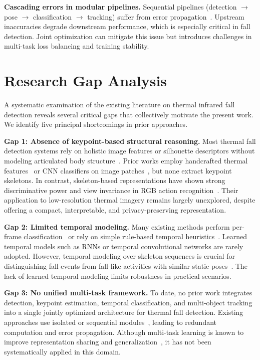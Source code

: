 \textbf{Cascading errors in modular pipelines.} Sequential pipelines (detection $\rightarrow$ pose $\rightarrow$ classification $\rightarrow$ tracking) suffer from error propagation~\cite{cao2017realtime}. Upstream inaccuracies degrade downstream performance, which is especially critical in fall detection. Joint optimization can mitigate this issue but introduces challenges in multi-task loss balancing and training stability.

\section{Research Gap Analysis}
\label{sec:intro_gap}

A systematic examination of the existing literature on thermal infrared fall detection reveals several critical gaps that collectively motivate the present work. We identify five principal shortcomings in prior approaches.

\textbf{Gap 1: Absence of keypoint-based structural reasoning.} 
Most thermal fall detection systems rely on holistic image features or silhouette descriptors without modeling articulated body structure~\cite{nogas2020fall,vadivelu2016thermal}. Prior works employ handcrafted thermal features~\cite{mashiyama2015activity} or CNN classifiers on image patches~\cite{nogas2020fall}, but none extract keypoint skeletons. In contrast, skeleton-based representations have shown strong discriminative power and view invariance in RGB action recognition~\cite{yan2018spatial,shi2019two}. Their application to low-resolution thermal imagery remains largely unexplored, despite offering a compact, interpretable, and privacy-preserving representation.

\textbf{Gap 2: Limited temporal modeling.} 
Many existing methods perform per-frame classification~\cite{vadivelu2016thermal,nogas2020fall} or rely on simple rule-based temporal heuristics~\cite{mashiyama2015activity}. Learned temporal models such as RNNs or temporal convolutional networks are rarely adopted. However, temporal modeling over skeleton sequences is crucial for distinguishing fall events from fall-like activities with similar static poses~\cite{du2015hierarchical,yan2018spatial}. The lack of learned temporal modeling limits robustness in practical scenarios.

\textbf{Gap 3: No unified multi-task framework.} 
To date, no prior work integrates detection, keypoint estimation, temporal classification, and multi-object tracking into a single jointly optimized architecture for thermal fall detection. Existing approaches use isolated or sequential modules~\cite{cao2017realtime}, leading to redundant computation and error propagation. Although multi-task learning is known to improve representation sharing and generalization~\cite{caruana1997multitask,ruder2017overview}, it has not been systematically applied in this domain.


